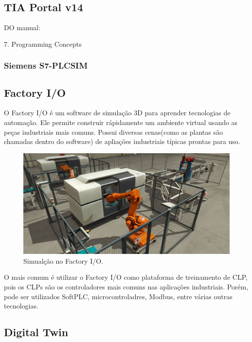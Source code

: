 \documentclass[a4paper, 12pt]{article}
\begin{document}
	\subsection{TIA Portal v14}
	
		DO manual:
		
		7. Programming Concepts
		
		\subsubsection{Siemens S7-PLCSIM}
	
	\subsection{Factory I/O}
	
		O Factory I/O é um software de simulação 3D para aprender tecnologias de automação.
		Ele permite construir rápidamente um ambiente virtual usando as peças industriais
		mais comuns. Possui diversas cenas(como as plantas são chamadas dentro do software)
		de apliações industriais típicas prontas para uso.
		
		\begin{figure}[H]
			\centering
			\includegraphics[scale=0.4]{figures/factory_io_1.jpg}
			\caption{Simualção no Factory I/O.}
			\label{fig:factory_simulation}
		\end{figure}
		
		O mais comum é utilizar o Factory I/O como plataforma de treinamento de CLP, pois
		os CLPs 	são os controladores mais comuns nas aplicações industriais. Porém, pode
		ser utilizados SoftPLC, microcontroladres, Modbus, entre várias outras tecnologias.
	
	\subsection{Digital Twin}
\end{document}
